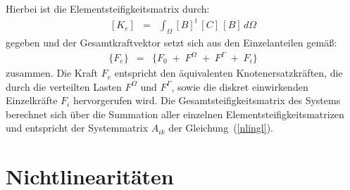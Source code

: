 Hierbei ist die Elementsteifigkeitsmatrix durch:
\begin{eqnarray}
\label{steif}
 [K_{e}] & = & \int_{\Omega} [B]^{t} \, [C] \, [B] \, d\Omega
\end{eqnarray}
gegeben und der Gesamtkraftvektor setzt sich aus den Einzelanteilen gemäß:
\begin{eqnarray}
\label{fges}
 \{F_{e}\} & = & \{F_{0} \; + \; F^{\Omega} \; + \; F^{\Gamma} \; + \; F_{i}\}
\end{eqnarray}
zusammen. Die Kraft $F_{e}$ entspricht den äquivalenten Knotenersatzkräften,
die durch die verteilten Lasten $F^{\Omega}$ und $F^{\Gamma}$, sowie die
diskret einwirkenden Einzelkräfte $F_{i}$ hervorgerufen wird. Die
Gesamtsteifigkeitsmatrix des Systems berechnet sich über die Summation aller
einzelnen Elementsteifigkeitsmatrizen und entspricht der Systemmatrix
$A_{ik}$ der Gleichung~(\ref{nlingl}).


\section{Nichtlinearitäten}
\label{nlstatberechnungen}

